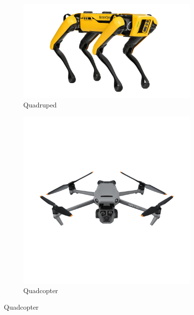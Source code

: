 \begin{figure}[H]
    \centering
    \begin{subfigure}[b]{0.45\textwidth}
        \includegraphics[width=\textwidth]{figures/quadruped.jpg}
        \caption{Quadruped}
        \label{fig:image1}
    \end{subfigure}
    \hfill
    \begin{subfigure}[b]{0.45\textwidth}
        \includegraphics[width=\textwidth]{figures/quadcopter.png}
        \caption{Quadcopter}
        \label{fig:image2}
    \end{subfigure}

    \vspace{1em} %


\end{figure}
